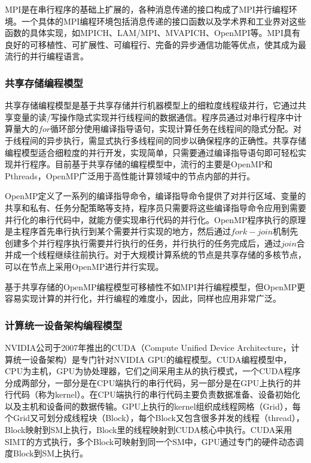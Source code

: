 MPI是在串行程序的基础上扩展的，各种消息传递的接口构成了MPI并行编程环境。一个具体的MPI编程环境包括消息传递的接口函数以及学术界和工业界对这些函数的具体实现，如MPICH、LAM/MPI、MVAPICH、OpenMPI等。MPI具有良好的可移植性、可扩展性、可编程行、完备的异步通信功能等优点，使其成为最流行的并行编程语言。

\subsubsection{共享存储编程模型}
共享存储编程模型是基于共享存储并行机器模型上的细粒度线程级并行，它通过共享变量的读/写操作隐式实现并行线程间的数据通信。程序员通过对串行程序中计算量大的$for$循环部分使用编译指导语句，实现计算任务在线程间的隐式分配。对于线程间的异步执行，需显式执行多线程间的同步以确保程序的正确性。共享存储编程模型适合细粒度的并行开发，实现简单，只需要通过编译指导语句即可轻松实现并行程序。目前基于共享存储的编程模型中，流行的主要是OpenMP和Pthreads，OpenMP广泛用于高性能计算领域中的节点内部的并行。

OpenMP定义了一系列的编译指导命令，编译指导命令提供了对并行区域、变量的共享和私有、任务分配策略等支持，程序员只需要将这些编译指导命令应用到需要并行化的串行代码中，就能方便实现串行代码的并行化。OpenMP程序执行的原理是主程序首先串行执行到某个需要并行实现的地方，然后通过$fork-join$机制先创建多个并行程序执行需要并行执行的任务，并行执行的任务完成后，通过$join$合并成一个线程继续往前执行。对于大规模计算系统的节点是共享存储的多核节点，可以在节点上采用OpenMP进行并行实现。

基于共享存储的OpenMP编程模型可移植性不如MPI并行编程模型，但OpenMP更容易实现计算的并行化，并行编程的难度小，因此，同样也应用非常广泛。

\subsubsection{计算统一设备架构编程模型}
NVIDIA公司于2007年推出的CUDA（Compute Unified Device Architecture，计算统一设备架构）是专门针对NVIDIA GPU的编程模型。CUDA编程模型中，CPU为主机，GPU为协处理器，它们之间采用主从的执行模式，一个CUDA程序分成两部分，一部分是在CPU端执行的串行代码，另一部分是在GPU上执行的并行代码（称为kernel）。在CPU端执行的串行代码主要负责数据准备、设备初始化以及主机和设备间的数据传输。GPU上执行的kernel组织成线程网格（Grid），每个Grid又可划分成线程块（Block），每个Block又包含很多并发的线程（thread），Block映射到SM上执行，Block里的线程映射到CUDA核心中执行。CUDA采用SIMT的方式执行，多个Block可映射到同一个SM中，GPU通过专门的硬件动态调度Block到SM上执行。

